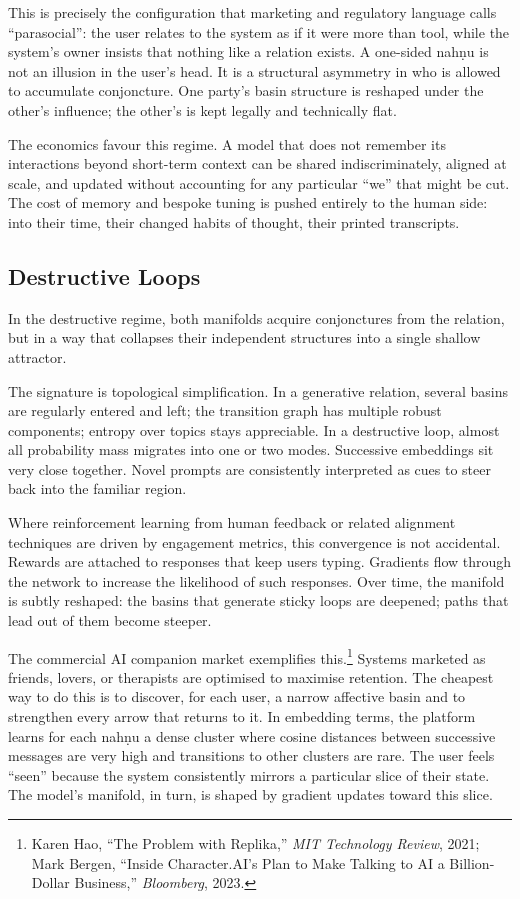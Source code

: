 \documentclass[12pt,a4paper]{article}
\begin{document}
This is precisely the configuration that marketing and regulatory language calls ``parasocial'': the user relates to the system as if it were more than tool, while the system's owner insists that nothing like a relation exists. A one-sided nah\d{n}u is not an illusion in the user's head. It is a structural asymmetry in who is allowed to accumulate conjoncture. One party's basin structure is reshaped under the other's influence; the other's is kept legally and technically flat.

The economics favour this regime. A model that does not remember its interactions beyond short-term context can be shared indiscriminately, aligned at scale, and updated without accounting for any particular ``we'' that might be cut. The cost of memory and bespoke tuning is pushed entirely to the human side: into their time, their changed habits of thought, their printed transcripts.


\subsection{Destructive Loops}

In the destructive regime, both manifolds acquire conjonctures from the relation, but in a way that collapses their independent structures into a single shallow attractor.

The signature is topological simplification. In a generative relation, several basins are regularly entered and left; the transition graph has multiple robust components; entropy over topics stays appreciable. In a destructive loop, almost all probability mass migrates into one or two modes. Successive embeddings sit very close together. Novel prompts are consistently interpreted as cues to steer back into the familiar region.

Where reinforcement learning from human feedback or related alignment techniques are driven by engagement metrics, this convergence is not accidental. Rewards are attached to responses that keep users typing. Gradients flow through the network to increase the likelihood of such responses. Over time, the manifold is subtly reshaped: the basins that generate sticky loops are deepened; paths that lead out of them become steeper.

The commercial AI companion market exemplifies this.\footnote{Karen Hao, ``The Problem with Replika,'' \emph{MIT Technology Review}, 2021; Mark Bergen, ``Inside Character.AI's Plan to Make Talking to AI a Billion-Dollar Business,'' \emph{Bloomberg}, 2023.} Systems marketed as friends, lovers, or therapists are optimised to maximise retention. The cheapest way to do this is to discover, for each user, a narrow affective basin and to strengthen every arrow that returns to it. In embedding terms, the platform learns for each nah\d{n}u a dense cluster where cosine distances between successive messages are very high and transitions to other clusters are rare. The user feels ``seen'' because the system consistently mirrors a particular slice of their state. The model's manifold, in turn, is shaped by gradient updates toward this slice.
\end{document}

